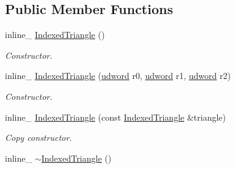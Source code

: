 \subsection*{Public Member Functions}
\begin{DoxyCompactItemize}
\item 
inline\+\_\+ \hyperlink{classOpcode_1_1IndexedTriangle_a80123e71b80a1eaffbe79952824a5c7c}{Indexed\+Triangle} ()\hypertarget{classOpcode_1_1IndexedTriangle_a80123e71b80a1eaffbe79952824a5c7c}{}\label{classOpcode_1_1IndexedTriangle_a80123e71b80a1eaffbe79952824a5c7c}

\begin{DoxyCompactList}\small\item\em Constructor. \end{DoxyCompactList}\item 
inline\+\_\+ \hyperlink{classOpcode_1_1IndexedTriangle_abe14ea4ac803aa569be75d02ca7d795a}{Indexed\+Triangle} (\hyperlink{IceTypes_8h_a44c6f1920ba5551225fb534f9d1a1733}{udword} r0, \hyperlink{IceTypes_8h_a44c6f1920ba5551225fb534f9d1a1733}{udword} r1, \hyperlink{IceTypes_8h_a44c6f1920ba5551225fb534f9d1a1733}{udword} r2)\hypertarget{classOpcode_1_1IndexedTriangle_abe14ea4ac803aa569be75d02ca7d795a}{}\label{classOpcode_1_1IndexedTriangle_abe14ea4ac803aa569be75d02ca7d795a}

\begin{DoxyCompactList}\small\item\em Constructor. \end{DoxyCompactList}\item 
inline\+\_\+ \hyperlink{classOpcode_1_1IndexedTriangle_a4e15c7702173080750233b108c9ae12e}{Indexed\+Triangle} (const \hyperlink{classOpcode_1_1IndexedTriangle}{Indexed\+Triangle} \&triangle)\hypertarget{classOpcode_1_1IndexedTriangle_a4e15c7702173080750233b108c9ae12e}{}\label{classOpcode_1_1IndexedTriangle_a4e15c7702173080750233b108c9ae12e}

\begin{DoxyCompactList}\small\item\em Copy constructor. \end{DoxyCompactList}\item 
inline\+\_\+ \hyperlink{classOpcode_1_1IndexedTriangle_aa7ee31ae752cb42cb9dbfa7868f6bd04}{$\sim$\+Indexed\+Triangle} ()\hypertarget{classOpcode_1_1IndexedTriangle_aa7ee31ae752cb42cb9dbfa7868f6bd04}{}\label{classOpcode_1_1IndexedTriangle_aa7ee31ae752cb42cb9dbfa7868f6bd04}


\end{DoxyCompactItemize}
